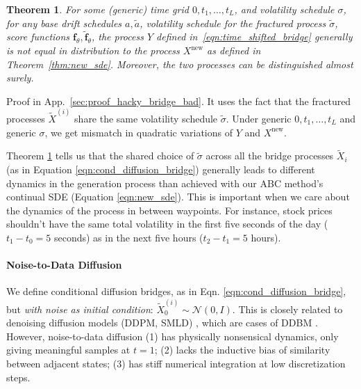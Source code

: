 \documentclass{article}
\newtheorem{theorem}{Theorem}
\begin{document}
\begin{theorem}
\label{thm:non_bijective_path_measure}
    For some (generic) time grid $0, t_1, \dots, t_L$, and volatility schedule $\sigma$, for any base drift schedules $a, \tilde{a}$, volatility schedule for the fractured process $\tilde{\sigma}$, score functions $\textbf{f}_{\theta}, \tilde{\textbf{f}}_{\theta}$,
    the process $Y$ defined in~\ref{eqn:time_shifted_bridge}
    generally is not equal in distribution to the process $X^{\text{new}}$ as defined in Theorem~\ref{thm:new_sde}. Moreover, the two processes can be distinguished almost surely.
\end{theorem}
Proof in App.~\ref{sec:proof_hacky_bridge_bad}.
It uses the fact that the fractured processes $\tilde{X}^{(i)}$ share the same volatility schedule $\tilde{\sigma}$. Under generic $0,t_1, \dots,t_L$ and generic $\sigma$, we get mismatch in
quadratic variations of $Y$ and $X^{\text{new}}$. %

Theorem \ref{thm:non_bijective_path_measure} tells us that the shared choice of $\tilde{\sigma}$ across all the bridge processes $\tilde{X}_i$ (as in Equation \ref{eqn:cond_diffusion_bridge}) generally leads to different dynamics in the generation process than achieved with our ABC method's continual SDE (Equation \ref{eqn:new_sde}).
This is important when we care about the dynamics of the process in between waypoints. For instance, stock prices shouldn't have the same total volatility in the first five seconds of the day ($t_1 - t_0 = 5$ seconds) as in the next five hours ($t_2 - t_1 = 5$ hours).

\paragraph{Noise-to-Data Diffusion}%

We define conditional diffusion bridges, as in Eqn. \ref{eqn:cond_diffusion_bridge}, but \textit{with noise as initial condition}: $\tilde{X}^{(i)}_0 \sim \mathcal{N}(0, I)$. This is closely related to denoising diffusion models (DDPM, SMLD) \cite{song2020score}, which are cases of DDBM \cite{zhou2023denoising}.
However, noise-to-data diffusion (1) has physically nonsensical dynamics, only giving meaningful samples at $t = 1$; (2) lacks the inductive bias of similarity between adjacent states; (3) has stiff numerical integration at low discretization steps.
\end{document}
